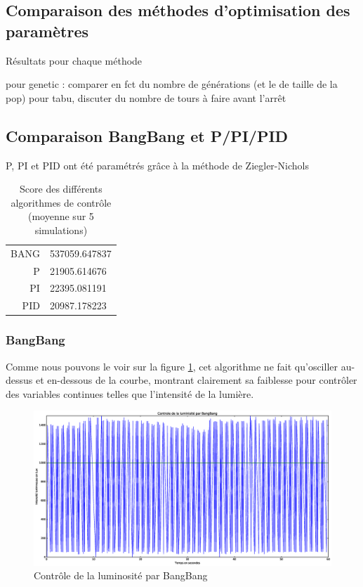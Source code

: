 \documentclass[a4paper,10pt]{report}
\begin{document}
\subsection{Comparaison des méthodes d'optimisation des paramètres}

Résultats pour chaque méthode

pour genetic : comparer en fct du nombre de générations (et le de taille de la pop)
pour tabu, discuter du nombre de tours à faire avant l'arrêt

\subsection{Comparaison BangBang et P/PI/PID}
P, PI et PID ont été paramétrés grâce à la méthode de Ziegler-Nichols
\begin{table}[h]
    \begin{center}
        \begin{tabular}{r l}
            BANG & 537059.647837\\
            P &   21905.614676\\
            PI &  22395.081191\\
            PID & 20987.178223
        \end{tabular}
    \end{center}
    \caption{Score des différents algorithmes de contrôle (moyenne sur 5 simulations)}
\end{table}

\subsubsection{BangBang}
Comme nous pouvons le voir sur la figure \ref{fig:bangbang}, cet algorithme ne fait qu'osciller au-dessus et en-dessous de la courbe, montrant clairement sa faiblesse pour contrôler des variables continues telles que l'intensité de la lumière.
\begin{figure}[hb!]
   \centering
   \includegraphics[scale=0.35]{BangBang.eps}
   \caption{\label{fig:bangbang} Contrôle de la luminosité par BangBang}
\end{figure}
\end{document}

